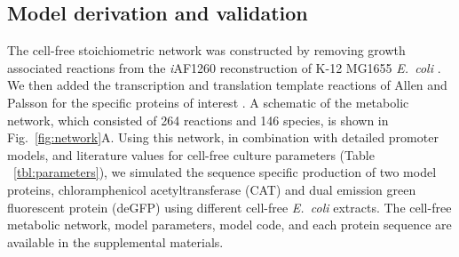 \documentclass[journal=asbcd6,manuscript=article]{achemso}
\begin{document}
\subsection{Model derivation and validation}
The cell-free stoichiometric network was constructed by removing growth associated reactions from the \textit{i}AF1260 reconstruction of K-12 MG1655 \textit{E.~coli} \cite{Feist:2007aa}.
We then added the transcription and translation template reactions of Allen and Palsson for the specific proteins of interest \cite{Allen:2003aa}.
A schematic of the metabolic network, which consisted of 264 reactions and 146 species, is shown in Fig.~\ref{fig:network}A.
Using this network, in combination with detailed promoter models, and literature values for cell-free culture parameters (Table ~\ref{tbl:parameters}),
we simulated the sequence specific production of two model proteins, chloramphenicol acetyltransferase (CAT) and dual emission green fluorescent protein (deGFP) using
different cell-free \textit{E.~coli} extracts. The cell-free metabolic network, model parameters, model code,
and each protein sequence are available in the supplemental materials.
\end{document}
